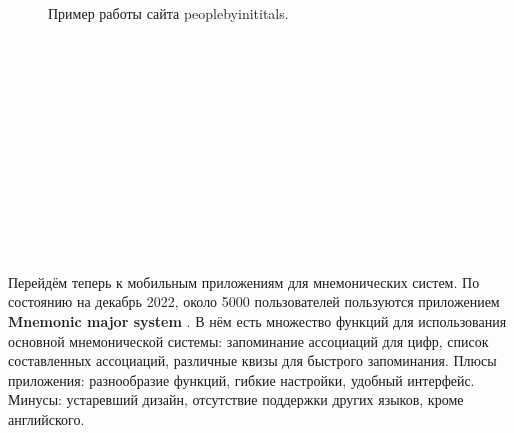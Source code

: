 \documentclass[draft]{article}
\begin{document}
\begin{figure}[h]
\caption{Пример работы сайта peoplebyinititals.}
\label{ris:image}
\end{figure}\\
~\\
~\\
~\\
~\\
~\\
~\\
~\\
~\\
~\\
~\\
~\\
Перейдём теперь к мобильным приложениям для мнемонических систем. По состоянию на декабрь 2022, около 5000 пользователей пользуются приложением \textbf{Mnemonic major system} \cite{litlink9}. В нём есть множество функций для использования основной мнемонической системы: запоминание ассоциаций для цифр, список составленных ассоциаций, различные квизы для быстрого запоминания. Плюсы приложения: разнообразие функций, гибкие настройки, удобный интерфейс. Минусы: устаревший дизайн, отсутствие поддержки других языков, кроме английского.\\
\end{document}
